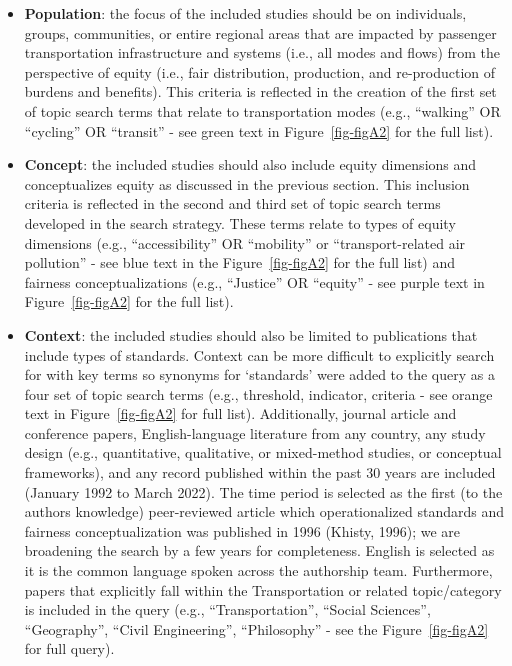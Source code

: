 \documentclass[
  letterpaper,
  DIV=11,
  numbers=noendperiod]{scrartcl}
\providecommand{\tightlist}{%
  \setlength{\itemsep}{0pt}\setlength{\parskip}{0pt}}\usepackage{longtable,booktabs,array}
\begin{document}
\begin{itemize}
\tightlist
\item
  \textbf{Population}: the focus of the included studies should be on
  individuals, groups, communities, or entire regional areas that are
  impacted by passenger transportation infrastructure and systems (i.e.,
  all modes and flows) from the perspective of equity (i.e., fair
  distribution, production, and re-production of burdens and benefits).
  This criteria is reflected in the creation of the first set of topic
  search terms that relate to transportation modes (e.g., ``walking'' OR
  ``cycling'' OR ``transit'' - see green text in Figure~\ref{fig-figA2}
  for the full list).
\item
  \textbf{Concept}: the included studies should also include equity
  dimensions and conceptualizes equity as discussed in the previous
  section. This inclusion criteria is reflected in the second and third
  set of topic search terms developed in the search strategy. These
  terms relate to types of equity dimensions (e.g., ``accessibility'' OR
  ``mobility'' or ``transport-related air pollution'' - see blue text in
  the Figure~\ref{fig-figA2} for the full list) and fairness
  conceptualizations (e.g., ``Justice'' OR ``equity'' - see purple text
  in Figure~\ref{fig-figA2} for the full list).
\item
  \textbf{Context}: the included studies should also be limited to
  publications that include types of standards. Context can be more
  difficult to explicitly search for with key terms so synonyms for
  `standards' were added to the query as a four set of topic search
  terms (e.g., threshold, indicator, criteria - see orange text in
  Figure~\ref{fig-figA2} for full list). Additionally, journal article
  and conference papers, English-language literature from any country,
  any study design (e.g., quantitative, qualitative, or mixed-method
  studies, or conceptual frameworks), and any record published within
  the past 30 years are included (January 1992 to March 2022). The time
  period is selected as the first (to the authors knowledge)
  peer-reviewed article which operationalized standards and fairness
  conceptualization was published in 1996 (Khisty, 1996); we are
  broadening the search by a few years for completeness. English is
  selected as it is the common language spoken across the authorship
  team. Furthermore, papers that explicitly fall within the
  Transportation or related topic/category is included in the query
  (e.g., ``Transportation'', ``Social Sciences'', ``Geography'', ``Civil
  Engineering'', ``Philosophy'' - see the Figure~\ref{fig-figA2} for
  full query).
\end{itemize}
\end{document}
